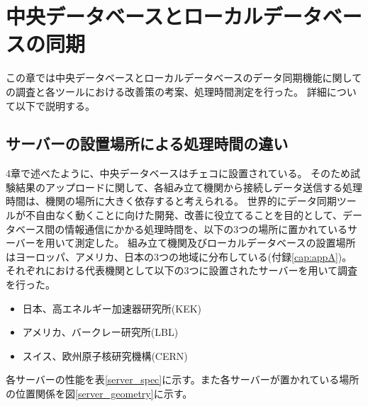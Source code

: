\chapter{中央データベースとローカルデータベースの同期}

この章では中央データベースとローカルデータベースのデータ同期機能に関しての調査と各ツールにおける改善策の考案、処理時間測定を行った。
詳細について以下で説明する。

\section{サーバーの設置場所による処理時間の違い}
4章で述べたように、中央データベースはチェコに設置されている。
そのため試験結果のアップロードに関して、各組み立て機関から接続しデータ送信する処理時間は、機関の場所に大きく依存すると考えられる。
世界的にデータ同期ツールが不自由なく動くことに向けた開発、改善に役立てることを目的として、データベース間の情報通信にかかる処理時間を、以下の3つの場所に置かれているサーバーを用いて測定した。
組み立て機関及びローカルデータベースの設置場所はヨーロッパ、アメリカ、日本の3つの地域に分布している(付録\ref{cap:appA})。
それぞれにおける代表機関として以下の3つに設置されたサーバーを用いて調査を行った。

\begin{itemize}
  \item 日本、高エネルギー加速器研究所(KEK) 
  \item アメリカ、バークレー研究所(LBL)
  \item スイス、欧州原子核研究機構(CERN)
\end{itemize}

各サーバーの性能を表\ref{server_spec}に示す。また各サーバーが置かれている場所の位置関係を図\ref{server_geometry}に示す。

\begin{table}[tbp]
\caption[各ローカルデータベースサーバーの性能一覧]{各ローカルデータベースサーバーの性能一覧。今回の調査に利用したサーバーの性能を示す。KEK(日本)、LBL(アメリカ)、CERN(スイス)に設置されたサーバーを用いた。}
\label{server_spec}
\end{table}

